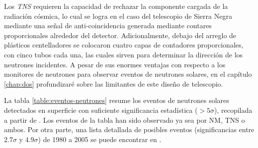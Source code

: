 Los \emph{TNS} requieren la capacidad de rechazar la componente cargada de la radiación cósmica, lo cual se logra en el caso del telescopio de Sierra Negra mediante una señal de anti-coincidencia generada mediante contares proporcionales alrededor del detector. Adicionalmente, debajo del arreglo de plásticos centelladores se colocaron cuatro capas de contadores proporcionales, con cinco tubos cada una, las cuales sirven para determinar la dirección de los neutrones incidentes. A pesar de sus enormes ventajas con respecto a los monitores de neutrones para observar eventos de neutrones solares, en el capítulo \ref{chap:dos} profundizaré sobre las limitantes de este diseño de telescopio.

La tabla \ref{table:eventos-neutrones} resume los eventos de neutrones solares detectados en superficie con suficiente significancia estadística ($>5\sigma$), recopilada a partir de \cite{watanabe05,sako06,muraki16}. Los eventos de la tabla han sido observado ya sea por NM, TNS o ambos. Por otra parte, una lista detallada de posibles eventos (significancias entre $2.7\sigma$ y $4.9\sigma$) de \num{1980} a \num{2005} se puede encontrar en \cite{mirosh15}.

